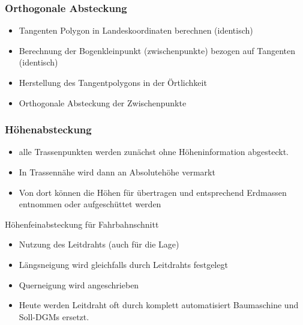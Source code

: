 \documentclass[12pt]{article}
\begin{document}
\subsubsection{Orthogonale Absteckung}
\begin{itemize}
\item Tangenten Polygon in Landeskoordinaten berechnen (identisch)
\item Berechnung der Bogenkleinpunkt (zwischenpunkte) bezogen auf Tangenten (identisch)
\item Herstellung des Tangentpolygons in der Örtlichkeit
\item Orthogonale Absteckung der Zwischenpunkte
\end{itemize}
\subsubsection{Höhenabsteckung}
\begin{itemize}
\item alle Trassenpunkten werden zunächst ohne Höheninformation abgesteckt.
\item In Trassennähe wird dann an Absolutehöhe vermarkt
\item Von dort können die Höhen für übertragen und entsprechend Erdmassen entnommen oder aufgeschüttet werden
\end{itemize}
Höhenfeinabsteckung für Fahrbahnschnitt
\begin{itemize}
\item Nutzung des Leitdrahts (auch für die Lage)
\item Längsneigung wird gleichfalls durch Leitdrahts festgelegt
\item Querneigung wird angeschrieben
\item Heute werden Leitdraht oft durch komplett automatisiert Baumaschine und Soll-DGMs ersetzt. 
\end{itemize}
\end{document}
